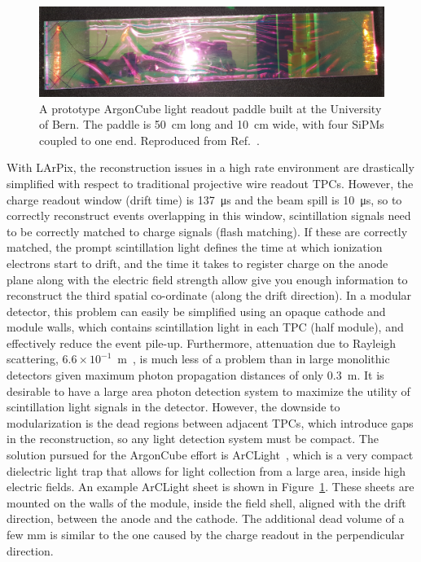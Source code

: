 \begin{figure}[!ht]
\centering
\includegraphics[width=0.75 \linewidth]{plots/1Film50x10.png}
\caption{A prototype ArgonCube light readout paddle built at the University of Bern. The paddle is 50~cm long and 10~cm wide, with four SiPMs coupled to one end. Reproduced from Ref.~\cite{argoncube_loi}.}
\label{fig:arclight}
\end{figure}

With LArPix, the reconstruction issues in a high rate environment are drastically simplified with respect to traditional projective wire readout TPCs. However, the charge readout window (drift time) is \SI{137}{\micro\second} and the beam spill is \SI{10}{\micro\second}, so to correctly reconstruct events overlapping in this window, scintillation signals need to be correctly matched to charge signals (flash matching). If these are correctly matched, the prompt scintillation light defines the time at which ionization electrons start to drift, and the time it takes to register charge on the anode plane along with the electric field strength allow give you enough information to reconstruct the third spatial co-ordinate (along the drift direction). In a modular detector, this problem can easily be simplified using an opaque cathode and module walls, which contains scintillation light in each TPC (half module), and effectively reduce the event pile-up. Furthermore, attenuation due to Rayleigh scattering, $6.6\times10^{-1}$~m~\cite{Rayleigh}, is much less of a problem than in large monolithic detectors given maximum photon propagation distances of only \SI{0.3}{\metre}. It is desirable to have a large area photon detection system to maximize the utility of scintillation light signals in the detector. However, the downside to modularization is the dead regions between adjacent TPCs, which introduce gaps in the reconstruction, so any light detection system must be compact. The solution pursued for the ArgonCube effort is ArCLight~\cite{arclight}, which is a very compact dielectric light trap that allows for light collection from a large area, inside high electric fields. An example ArCLight sheet is shown in Figure~\ref{fig:arclight}. These sheets are mounted on the walls of the module, inside the field shell, aligned with the drift direction, between the anode and the cathode. The additional dead volume of a few \si{\milli\metre} is similar to the one caused by the charge readout in the perpendicular direction.


